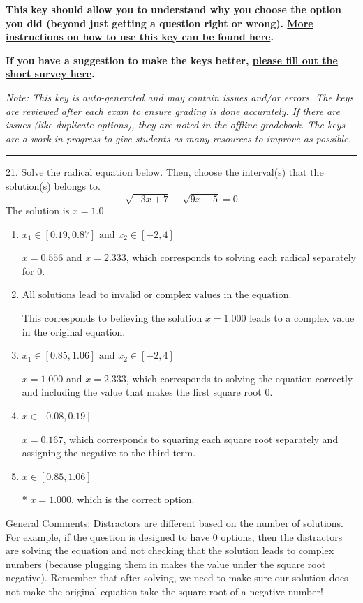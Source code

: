 \documentclass{extbook}[14pt]
\begin{document}
\textbf{This key should allow you to understand why you choose the option you did (beyond just getting a question right or wrong). \href{https://xronos.clas.ufl.edu/mac1105spring2020/courseDescriptionAndMisc/Exams/LearningFromResults}{More instructions on how to use this key can be found here}.}

\textbf{If you have a suggestion to make the keys better, \href{https://forms.gle/CZkbZmPbC9XALEE88}{please fill out the short survey here}.}

\textit{Note: This key is auto-generated and may contain issues and/or errors. The keys are reviewed after each exam to ensure grading is done accurately. If there are issues (like duplicate options), they are noted in the offline gradebook. The keys are a work-in-progress to give students as many resources to improve as possible.}

\rule{\textwidth}{0.4pt}

21. Solve the radical equation below. Then, choose the interval(s) that the solution(s) belongs to.
\[ \sqrt{-3 x + 7} - \sqrt{9 x - 5} = 0 \] 
The solution is $ x = 1.0 $ 

\begin{enumerate}[label=\Alph*.] 
\item $ x_1 \in [0.19, 0.87] \text{ and } x_2 \in [-2,4] $ 

 $x = 0.556$ and $x = 2.333$, which corresponds to solving each radical separately for 0. 
\item $ \text{All solutions lead to invalid or complex values in the equation.} $ 

 This corresponds to believing the solution $x = 1.000$ leads to a complex value in the original equation. 
\item $ x_1 \in [0.85, 1.06] \text{ and } x_2 \in [-2,4] $ 

 $x = 1.000$ and $x = 2.333$, which corresponds to solving the equation correctly and including the value that makes the first square root 0. 
\item $ x \in [0.08,0.19] $ 

 $x = 0.167$, which corresponds to squaring each square root separately and assigning the negative to the third term. 
\item $ x \in [0.85,1.06] $ 

 * $x = 1.000$, which is the correct option. 
\end{enumerate} 
 
General Comments: Distractors are different based on the number of solutions. For example, if the question is designed to have 0 options, then the distractors are solving the equation and not checking that the solution leads to complex numbers (because plugging them in makes the value under the square root negative). Remember that after solving, we need to make sure our solution does not make the original equation take the square root of a negative number!
\end{document}
